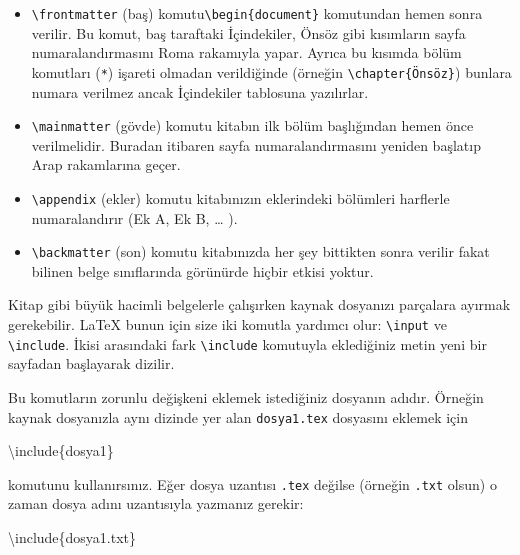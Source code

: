 \documentclass[
  10pt,
]{scrbook}
\newenvironment{Shaded}{\begin{snugshade}}{\end{snugshade}}
\newcommand{\BuiltInTok}[1]{#1}
\newcommand{\ExtensionTok}[1]{#1}
\newcommand{\NormalTok}[1]{#1}
\providecommand{\tightlist}{%
  \setlength{\itemsep}{0pt}\setlength{\parskip}{0pt}}
\theoremstyle{definition}
\theoremstyle{definition}
\theoremstyle{definition}
\theoremstyle{definition}
\theoremstyle{remark}
\begin{document}
\begin{itemize}
\tightlist
\item
  \texttt{\textbackslash{}frontmatter} (baş) komutu\texttt{\textbackslash{}begin\{document\}} komutundan hemen sonra verilir. Bu komut, baş taraftaki İçindekiler, Önsöz gibi kısımların sayfa numaralandırmasını Roma rakamıyla yapar. Ayrıca bu kısımda bölüm komutları (\texttt{*}) işareti olmadan verildiğinde (örneğin \texttt{\textbackslash{}chapter\{Önsöz\}}) bunlara numara verilmez ancak İçindekiler tablosuna yazılırlar.
\item
  \texttt{\textbackslash{}mainmatter} (gövde) komutu kitabın ilk bölüm başlığından hemen önce verilmelidir. Buradan itibaren sayfa numaralandırmasını yeniden başlatıp Arap rakamlarına geçer.
\item
  \texttt{\textbackslash{}appendix} (ekler) komutu kitabınızın eklerindeki bölümleri harflerle numaralandırır (Ek A, Ek B, \ldots{} ).
\item
  \texttt{\textbackslash{}backmatter} (son) komutu kitabınızda her şey bittikten sonra verilir fakat bilinen belge sınıflarında görünürde hiçbir etkisi yoktur.
\end{itemize}

Kitap gibi büyük hacimli belgelerle çalışırken kaynak dosyanızı parçalara ayırmak gerekebilir. LaTeX bunun için size iki komutla yardımcı olur: \texttt{\textbackslash{}input} ve \texttt{\textbackslash{}include}. İkisi arasındaki fark \texttt{\textbackslash{}include} komutuyla eklediğiniz metin yeni bir sayfadan başlayarak dizilir.

Bu komutların zorunlu değişkeni eklemek istediğiniz dosyanın adıdır. Örneğin kaynak dosyanızla aynı dizinde yer alan \texttt{dosya1.tex} dosyasını eklemek için

\begin{Shaded}
\begin{Highlighting}[]
\BuiltInTok{\textbackslash{}include}\NormalTok{\{}\ExtensionTok{dosya1}\NormalTok{\}}
\end{Highlighting}
\end{Shaded}

komutunu kullanırsınız. Eğer dosya uzantısı \texttt{.tex} değilse (örneğin \texttt{.txt} olsun) o zaman dosya adını uzantısıyla yazmanız gerekir:

\begin{Shaded}
\begin{Highlighting}[]
\BuiltInTok{\textbackslash{}include}\NormalTok{\{}\ExtensionTok{dosya1.txt}\NormalTok{\}}
\end{Highlighting}
\end{Shaded}
\end{document}
